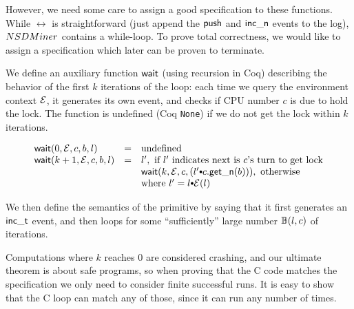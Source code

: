 However, we need some care to assign a good specification to these
functions. While $\rel$ is straightforward (just append the
$\push$ and $\incnow$ events to the log), 
$\acq$ contains a while-loop. To prove total correctness,
we would like to assign a specification which later can be proven
to terminate.

We define an auxiliary function $\comm{wait}$
(using recursion in Coq) describing the behavior of the first $k$
iterations of the loop: each time we query the environment
context $\oracle$, it generates its own
event, and checks if CPU number $c$ is due to hold the
lock. The function is undefined (Coq {\tt None}) if we do not get the
lock within $k$ iterations.
\begin{small}
\[
\begin{array}{lcl}
\mathsf{wait}(0, \oracle, c, b, l) & = &\text{undefined} \\
\mathsf{wait}(k+1, \oracle, c, b, l) & = & l', \text{ if $l'$ indicates next is $c$'s turn to get lock}\\
                       & &   \mathsf{wait}(k, \oracle, c,  (l' \cons c.\getnow(b))), \text{ otherwise} \\
                       & &  \text{where }l' = l \cons  \oracle(l)
\end{array}
\]
\end{small}%

We then define the semantics of the primitive by saying that it first
generates an $\incticket$ event, and then loops
for some ``sufficiently'' large number $\calwait(l, c)$ of iterations.
\begin{small}
\begin{mathpar}
\end{mathpar}
\end{small}

Computations where $k$ reaches 0 are considered crashing, and our
ultimate theorem is about safe programs, so when proving that the C
code matches the specification we only need to consider finite
successful runs. It is easy to show that the C loop can match any of
those, since it can run any number of times.

